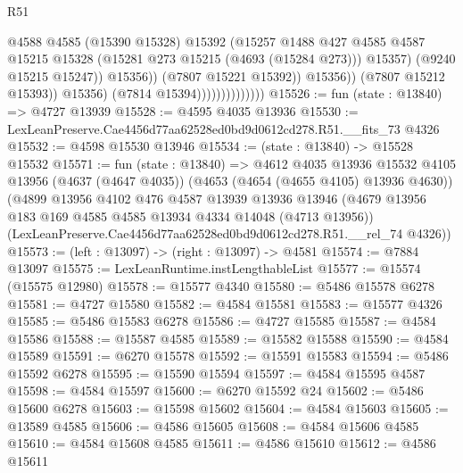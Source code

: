 \begin{lexlean}{R51}
\begin{coremodule}
                                              @4588
                                              @4585
                                              (@15390 @15328)
                                              @15392
                                              (@15257
                                                @1488
                                                @427
                                                @4585
                                                @4587
                                                @15215
                                                @15328
                                                (@15281 @273 @15215 (@4693 (@15284 @273)))
                                                @15357)
                                              (@9240 @15215 @15247))
                                            @15356))
                                        (@7807 @15221 @15392))
                                      @15356))
                                  (@7807 @15212 @15393))
                                @15356)
                              (@7814 @15394))))))))))))))
@15526 := fun (state : @13840) => @4727 @13939
@15528 := @4595 @4035 @13936
@15530 := LexLeanPreserve.Cae4456d77aa62528ed0bd9d0612cd278.R51.__fits_73 @4326
@15532 := @4598 @15530 @13946
@15534 := (state : @13840) -> @15528 @15532
@15571 := fun (state : @13840) =>
  @4612
    @4035
    @13936
    @15532
    @4105
    @13956
    (@4637 (@4647 @4035))
    (@4653 (@4654 (@4655 @4105) @13936 @4630))
    (@4899
      @13956
      @4102
      @476
      @4587
      @13939
      @13936
      @13946
      (@4679 @13956 @183 @169 @4585 @4585 @13934 @4334 @14048 (@4713 @13956))
      (LexLeanPreserve.Cae4456d77aa62528ed0bd9d0612cd278.R51.__rel_74 @4326))
@15573 := (left : @13097) -> (right : @13097) -> @4581
@15574 := @7884 @13097
@15575 := LexLeanRuntime.instLengthableList
@15577 := @15574 (@15575 @12980)
@15578 := @15577 @4340
@15580 := @5486 @15578 @6278
@15581 := @4727 @15580
@15582 := @4584 @15581
@15583 := @15577 @4326
@15585 := @5486 @15583 @6278
@15586 := @4727 @15585
@15587 := @4584 @15586
@15588 := @15587 @4585
@15589 := @15582 @15588
@15590 := @4584 @15589
@15591 := @6270 @15578
@15592 := @15591 @15583
@15594 := @5486 @15592 @6278
@15595 := @15590 @15594
@15597 := @4584 @15595 @4587
@15598 := @4584 @15597
@15600 := @6270 @15592 @24
@15602 := @5486 @15600 @6278
@15603 := @15598 @15602
@15604 := @4584 @15603
@15605 := @13589 @4585
@15606 := @4586 @15605
@15608 := @4584 @15606 @4585
@15610 := @4584 @15608 @4585
@15611 := @4586 @15610
@15612 := @4586 @15611

\end{coremodule}
\end{lexlean}
